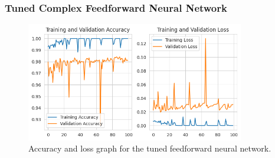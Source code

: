 \subsubsection{Tuned Complex Feedforward Neural Network}

\begin{figure}[ht]
    \centering
    \includegraphics[width=0.85\textwidth]{./img/ffnn/tuned/accuracy-loss-graph}
    \caption{Accuracy and loss graph for the tuned feedforward neural network.}
    \label{fig:ffnn-tuned-accuracy-loss-graph}
\end{figure}

